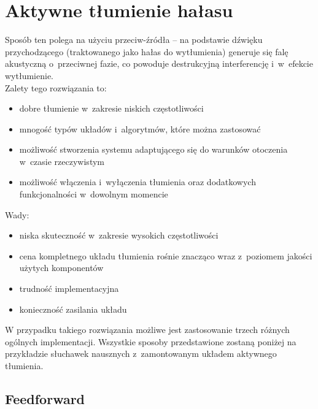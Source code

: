 \section{Aktywne tłumienie hałasu}
\label{sec:ANC}
Sposób ten polega na użyciu przeciw-źródła -- na podstawie dźwięku przychodzącego (traktowanego jako hałas do wytłumienia) generuje się falę akustyczną o~przeciwnej fazie, co powoduje destrukcyjną interferencję i~w~efekcie wytłumienie.\\
Zalety tego rozwiązania to:
\begin{itemize}
	\item dobre tłumienie w~zakresie niskich częstotliwości
	\item mnogość typów układów i~algorytmów, które można zastosować
	\item możliwość stworzenia systemu adaptującego się do warunków otoczenia w~czasie rzeczywistym
	\item możliwość włączenia i~wyłączenia tłumienia oraz dodatkowych funkcjonalności w~dowolnym momencie
\end{itemize}
Wady:
\begin{itemize}
	\item niska skuteczność w~zakresie wysokich częstotliwości
	\item cena kompletnego układu tłumienia rośnie znacząco wraz z~poziomem jakości użytych komponentów
	\item trudność implementacyjna
	\item konieczność zasilania układu
\end{itemize}
W przypadku takiego rozwiązania możliwe jest zastosowanie trzech różnych ogólnych implementacji. Wszystkie sposoby przedstawione zostaną poniżej na przykładzie słuchawek nausznych z~zamontowanym układem aktywnego tłumienia.
\subsection{Feedforward}
\label{feedforward}

